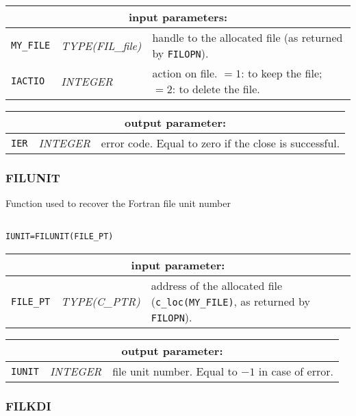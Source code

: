 \noindent
\begin{tabular}{|p{1.5cm}|p{3cm}|p{10cm}|}
\hline
\multicolumn{3}{|c|}{\bf input parameters:} \\
\hline
{\tt MY\_FILE} & {\it TYPE(FIL\_file)} &  handle to the allocated file (as returned by {\tt FILOPN}). \\
\hline
{\tt IACTIO} & {\it INTEGER}  & action on file.
$=1$: to keep the file;
$=2$: to delete the file.  \\
\hline
\end{tabular}

\vskip 0.4cm
\noindent
\begin{tabular}{|p{1.5cm}|p{3cm}|p{10cm}|}
\hline
\multicolumn{3}{|c|}{\bf output parameter:} \\
\hline
{\tt IER} & {\it INTEGER}  & error code. Equal to zero if the close is successful.  \\
\hline
\end{tabular}

\subsubsection{FILUNIT}

Function used to recover the Fortran file unit number

\begin{verbatim}

IUNIT=FILUNIT(FILE_PT)
\end{verbatim}

\noindent
\begin{tabular}{|p{1.5cm}|p{3cm}|p{10cm}|}
\hline
\multicolumn{3}{|c|}{\bf input parameter:} \\
\hline
{\tt FILE\_PT} & {\it TYPE(C\_PTR)} &  address of the allocated file ({\tt c\_loc(MY\_FILE)}, as returned by {\tt FILOPN}). \\
\hline
\end{tabular}

\vskip 0.4cm
\noindent
\begin{tabular}{|p{1.5cm}|p{3cm}|p{10cm}|}
\hline
\multicolumn{3}{|c|}{\bf output parameter:} \\
\hline
{\tt IUNIT} & {\it INTEGER}  & file unit number. Equal to $-1$ in case of error. \\
\hline
\end{tabular}

\subsubsection{FILKDI}

